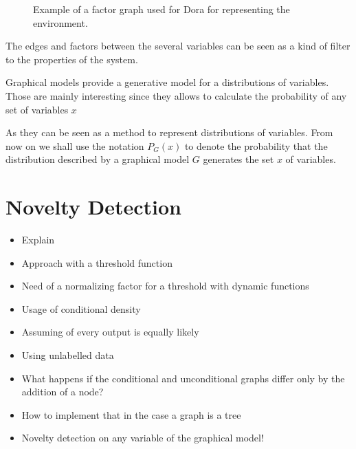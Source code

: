 \documentclass[runningheads,a4paper]{llncs}
\begin{document}
\begin{figure}[h]
\centering
{}
\caption{Example of a factor graph used for Dora for representing the environment.}
\end{figure}

The edges and factors between the several variables can be seen as a kind of filter to
the properties of the system.

Graphical models provide a generative model for a distributions of variables.
Those are mainly interesting since they allows to calculate the probability of any set of variables $x$

As they can be seen as a method to represent distributions of variables. From now on we shall use the notation $P_G(x)$ to denote the probability that the distribution described by a graphical model $G$ generates the set $x$ of variables.

\section{Novelty Detection}
\begin{itemize}
\item Explain 
\item Approach with a threshold function
\item Need of a normalizing factor for a threshold with dynamic functions
\item Usage of conditional density
\item Assuming of every output is equally likely
\item Using unlabelled data
\item What happens if the conditional and unconditional graphs differ only by the addition of a node?
\item How to implement that in the case a graph is a tree
\item Novelty detection on any variable of the graphical model!
\end{itemize}
\end{document}
